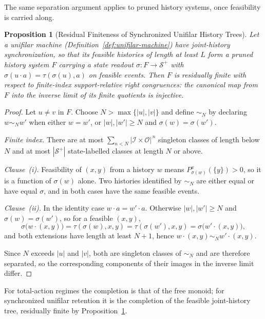 \documentclass[12pt]{article}
\newtheorem{proposition}[theorem]{Proposition}
\theoremstyle{definition}
\newcommand{\Splus}{\mathcal S^{+}}
\begin{document}
The same separation argument applies to pruned history systems, once
feasibility is carried along.

\begin{proposition}[Residual Finiteness of Synchronized Unifilar History Trees]
\label{prop:unifilar-residually-finite}
Let a unifilar machine (Definition~\ref{def:unifilar-machine}) have
joint-history synchronization, so that its feasible histories of length at
least $L$ form a pruned history system $F$ carrying a state readout
$\sigma:F\to\Splus$ with $\sigma(u\cdot a)=\tau(\sigma(u),a)$ on feasible
events.  Then $F$ is residually finite with respect to finite-index
support-relative right congruences: the canonical map from $F$ into the inverse
limit of its finite quotients is injective.
\end{proposition}

\begin{proof}
Let $u\neq v$ in $F$.  Choose $N>\max\{|u|,|v|\}$ and define $\sim_N$ by
declaring $w\sim_Nw'$ when either $w=w'$, or $|w|,|w'|\ge N$ and
$\sigma(w)=\sigma(w')$.

\emph{Finite index.}  There are at most
$\sum_{n<N}|\mathcal I\times\mathcal O|^{\,n}$ singleton classes of length
below $N$ and at most $|\Splus|$ state-labelled classes at length $N$ or
above.

\emph{Clause~(i).}  Feasibility of $(x,y)$ from a history $w$ means
$P_{\sigma(w)}^x(\{y\})>0$, so it is a function of $\sigma(w)$ alone.  Two
histories identified by $\sim_N$ are either equal or have equal $\sigma$, and
in both cases have the same feasible events.

\emph{Clause~(ii).}  In the identity case $w\cdot a=w'\cdot a$.  Otherwise
$|w|,|w'|\ge N$ and $\sigma(w)=\sigma(w')$, so for a feasible $(x,y)$,
\[
\sigma\bigl(w\cdot(x,y)\bigr)
=
\tau(\sigma(w),x,y)
=
\tau(\sigma(w'),x,y)
=
\sigma\bigl(w'\cdot(x,y)\bigr),
\]
and both extensions have length at least $N+1$, hence
$w\cdot(x,y)\sim_Nw'\cdot(x,y)$.

Since $N$ exceeds $|u|$ and $|v|$, both are singleton classes of $\sim_N$ and
are therefore separated, so the corresponding components of their images in
the inverse limit differ.
\end{proof}

For total-action regimes the completion is that of the free monoid; for
synchronized unifilar retention it is the completion of the feasible
joint-history tree, residually finite by
Proposition~\ref{prop:unifilar-residually-finite}.
\end{document}
